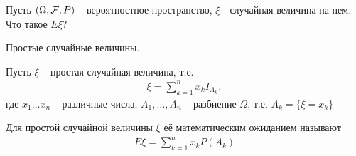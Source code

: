 
Пусть $(\Omega, \mathcal{F}, P)$ -- вероятностное пространство, $\xi$ - случайная величина на нем. 
Что такое $E \xi$?

Простые случайные величины.

Пусть $\xi$ -- простая случайная величина, т.е. 
\begin{align*}
  \xi = \sum_{k = 1}^{n} x_k I_{A_k},
\end{align*}
где $x_1 \ldots x_n$ -- различные числа, $A_1, \ldots, A_n$ 
-- разбиение $\Omega$, т.е. $A_k = \{ \xi = x_k \}$

\begin{definition}
  Для простой случайной величины $\xi$ её математическим ожиданием называют
  \begin{align*}
    E\xi = \sum_{k = 1}^n x_k P(A_k)
  \end{align*}
\end{definition}


